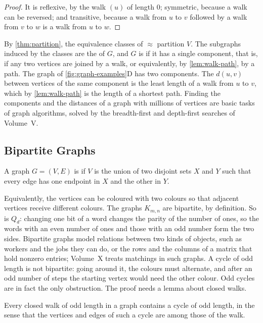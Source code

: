 \begin{proof}
It is reflexive, by the walk $(u)$ of length $0$; symmetric, because a walk can be reversed; and transitive, because a walk from $u$ to $v$ followed by a walk from $v$ to $w$ is a walk from $u$ to $w$.
\end{proof}

By \cref{thm:partition}, the equivalence classes of $\approx$ partition $V$. The subgraphs induced by the classes are the  of $G$, and $G$ is  if it has a single component, that is, if any two vertices are joined by a walk, or equivalently, by \cref{lem:walk-path}, by a path. The graph of \cref{fig:graph-examples}D has two components. The  $d(u,v)$ between vertices of the same component is the least length of a walk from $u$ to $v$, which by \cref{lem:walk-path} is the length of a shortest path. Finding the components and the distances of a graph with millions of vertices are basic tasks of graph algorithms, solved by the breadth-first and depth-first searches of Volume~V.

\subsection{Bipartite Graphs}

\begin{definition}
\label{def:bipartite}
A graph $G=(V,E)$ is  if $V$ is the union of two disjoint sets $X$ and $Y$ such that every edge has one endpoint in $X$ and the other in $Y$.
\end{definition}

Equivalently, the vertices can be coloured with two colours so that adjacent vertices receive different colours. The graphs $K_{m,n}$ are bipartite, by definition. So is $Q_d$: changing one bit of a word changes the parity of the number of ones, so the words with an even number of ones and those with an odd number form the two sides. Bipartite graphs model relations between two kinds of objects, such as workers and the jobs they can do, or the rows and the columns of a matrix that hold nonzero entries; Volume~X treats matchings in such graphs. A cycle of odd length is not bipartite: going around it, the colours must alternate, and after an odd number of steps the starting vertex would need the other colour. Odd cycles are in fact the only obstruction. The proof needs a lemma about closed walks.

\begin{lemma}
\label{lem:odd-walk}
Every closed walk of odd length in a graph contains a cycle of odd length, in the sense that the vertices and edges of such a cycle are among those of the walk.
\end{lemma}

